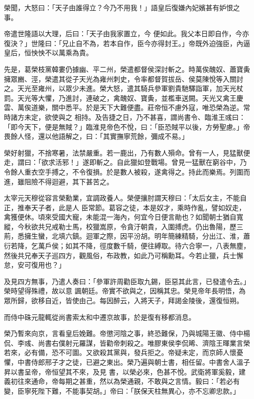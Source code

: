 \begin{pinyinscope}
 榮聞，大怒曰：「天子由誰得立？今乃不用我！」語皇后復嫌內妃嬪甚有妒恨之事。



 帝遣世隆語以大理，后曰：「天子由我家置立，今
 便如此。我父本日即自作，今亦復決？」世隆曰：「兄止自不為，若本自作，臣今亦得封王。」帝既外迫強臣，內逼皇后，恒怏怏不以萬乘為貴。



 先是，葛榮枝黨韓婁仍據幽、平二州，榮遣都督侯深討斬之。時萬俟醜奴、蕭寶夤擁眾豳、涇，榮遣其從子天光為雍州刺史，令率都督賀拔岳、侯莫陳悅等入關討之。天光至雍州，以眾少未進。榮大怒，遣其騎兵參軍劉貴馳驛詣軍，加天光杖罰。天光等大懼，乃進討，連破之，禽醜奴、寶夤，並檻車送闕。天光又禽王慶雲、萬俟道樂，關中悉平。於是天下大難便盡。莊帝恒不慮外寇，唯恐榮為逆。常時諸方未定，欲使與之
 相持。及告捷之日，乃不甚喜，謂尚書令、臨淮王彧曰：「即今天下，便是無賊？」臨淮見帝色不悅，曰：「臣恐賊平以後，方勞聖慮。」帝畏餘人怪，還以他語解之，曰：「其實撫寧荒餘，彌成不易。」



 榮好射獵，不捨寒暑，法禁嚴重。若一鹿出，乃有數人殞命。曾有一人，見猛獸便走，謂曰：「欲求活邪！」遂即斬之。自此獵如登戰場。曾見一猛獸在窮谷中，乃令餘人重衣空手搏之，不令復損。於是數人被殺，遂禽得之。持此而樂焉。列圍而進，雖阻險不得迴避，其下甚苦之。



 太宰元天穆從容言榮勳業，宜調政養人。榮便攘肘謂天穆曰：「太后女主，不能自正，推奉天子者，此是人
 臣常節。葛容之徒，本是奴才，乘時作亂，譬如奴走，禽獲便休。頃來受國大寵，未能混一海內，何宜今日便言勛也？如聞朝士猶自寬縱，今秋欲共兄戒勒士馬，校獵嵩原，令貪汙朝貴，入圍搏虎。仍出魯陽，歷三荊，悉擁生蠻，北填六鎮。迴軍之際，因平汾胡。明年簡練精騎，分出江、淮，蕭衍若降，乞萬戶侯；如其不降，徑度數千騎，便往縛取。待六合寧一，八表無塵，然後共兄奉天子巡四方，觀風俗，布政教，如此乃可稱勳耳。今若止獵，兵士懈怠，安可復用也？」



 及見四方無事，乃遣人奏曰：「參軍許周勸臣取九錫，臣惡其此言，已發遣令去。」榮時望得殊禮，故以意
 諷朝廷。帝實不欲與之，因稱其忠。榮見帝年長明悟，為眾所歸，欲移自近，皆使由己。每因醉云，入將天子，拜謁金陵後，還復恒朔。



 而侍中硃元龍輒從尚書索太和中遷京故事，於是復有移都消息。



 榮乃暫來向京，言看皇后娩難。帝懲河陰之事，終恐難保，乃與城陽王徽、侍中楊侃、李彧、尚書右僕射元羅謀，皆勸帝刺殺之。唯膠東侯李侃晞、濟陰王暉業言榮若來，必有備，恐不可圖。又欲殺其黨與，發兵拒之。帝疑未定，而京師人懷憂懼，中書侍郎邢子才之徒，已避之東出。榮乃遍與朝士書，相任留。中書舍人溫子昇以書呈帝，帝恒望其不來，及見
 書，以榮必來，色甚不悅。武衛將軍奚毅，建義初往來通命，帝每期之甚重，然以為榮通親，不敢與之言情。毅曰：「若必有變，臣寧死陛下難，不能事契胡。」帝曰：「朕保天柱無異心，亦不忘卿忠款。」




\end{pinyinscope}
